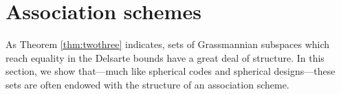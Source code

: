 \documentclass[12pt]{article}
\numberwithin{equation}{section}
\theoremstyle{plainsl}
\newcommand\al{\alpha}
\newcommand\be{\beta}
\newcommand\opk[1]{\mathop{\mathrm{#1}}\nolimits}
\newcommand\tr{\opk{tr}}
\begin{document}

\section{Association schemes}
\label{sec:assoc}

As Theorem \ref{thm:twothree} indicates, sets of Grassmannian subspaces which reach equality in the Delsarte bounds have a great deal of structure. In this section, we show that---much like spherical codes and spherical designs---these sets are often endowed with the structure of an association scheme. 
\end{document}
